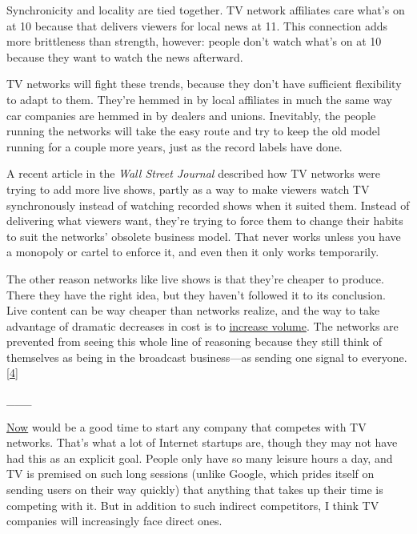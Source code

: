 Synchronicity
                  and locality are tied together. TV network affiliates care
                  what's on at 10 because that delivers viewers for local news
                  at 11. This connection adds more brittleness than strength,
                  however: people don't watch what's on at 10 because they want
                  to watch the news afterward.

TV networks will fight
                  these trends, because they don't have sufficient flexibility
                  to adapt to them. They're hemmed in by local affiliates in
                  much the same way car companies are hemmed in by dealers and
                  unions. Inevitably, the people running the networks will take
                  the easy route and try to keep the old model running for a
                  couple more years, just as the record labels have done.

A
                  recent article in the \emph{Wall Street Journal} described how
                  TV networks were trying to add more live shows, partly as a
                  way to make viewers watch TV synchronously instead of watching
                  recorded shows when it suited them. Instead of delivering what
                  viewers want, they're trying to force them to change their
                  habits to suit the networks' obsolete business model. That
                  never works unless you have a monopoly or cartel to enforce
                  it, and even then it only works temporarily.

The
                  other reason networks like live shows is that they're cheaper
                  to produce. There they have the right idea, but they haven't
                  followed it to its conclusion. Live content can be way cheaper
                  than networks realize, and the way to take advantage of
                  dramatic decreases in cost is to
                  \href{http://justin.tv}{increase volume}. The networks
                  are prevented from seeing this whole line of reasoning because
                  they still think of themselves as being in the broadcast
                  business---as sending one signal to everyone.
                  [\href{\#f4n}{4}]


                  \_\_\_
                  

\href{http://www.paulgraham.com/badeconomy.html}{Now} would be a good
                  time to start any company that competes with TV networks.
                  That's what a lot of Internet startups are, though they may
                  not have had this as an explicit goal. People only have so
                  many leisure hours a day, and TV is premised on such long
                  sessions (unlike Google, which prides itself on sending users
                  on their way quickly) that anything that takes up their time
                  is competing with it. But in addition to such indirect
                  competitors, I think TV companies will increasingly face
                  direct ones.

